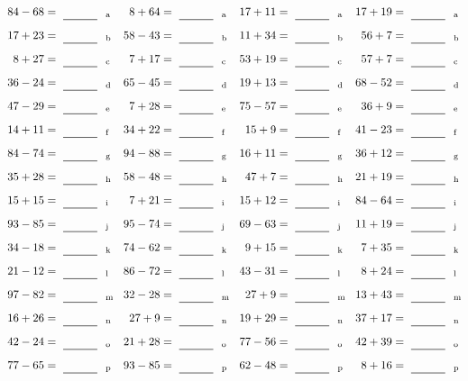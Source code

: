 \documentclass
[
  draft    = true,
  fontsize = 11pt,
  parskip  = half-
]
{scrartcl}
\begin{document}
\clearpage
\begin{align*}
    \pline{84-68}&=\rline{a}
  & \pline{8+64}&=\rline{a}
  & \pline{17+11}&=\rline{a}
  & \pline{17+19}&=\rline{a} \\[1ex]
    \pline{17+23}&=\rline{b}
  & \pline{58-43}&=\rline{b}
  & \pline{11+34}&=\rline{b}
  & \pline{56+7}&=\rline{b} \\[1ex]
    \pline{8+27}&=\rline{c}
  & \pline{7+17}&=\rline{c}
  & \pline{53+19}&=\rline{c}
  & \pline{57+7}&=\rline{c} \\[1ex]
    \pline{36-24}&=\rline{d}
  & \pline{65-45}&=\rline{d}
  & \pline{19+13}&=\rline{d}
  & \pline{68-52}&=\rline{d} \\[1ex]
    \pline{47-29}&=\rline{e}
  & \pline{7+28}&=\rline{e}
  & \pline{75-57}&=\rline{e}
  & \pline{36+9}&=\rline{e} \\[1ex]
    \pline{14+11}&=\rline{f}
  & \pline{34+22}&=\rline{f}
  & \pline{15+9}&=\rline{f}
  & \pline{41-23}&=\rline{f} \\[1ex]
    \pline{84-74}&=\rline{g}
  & \pline{94-88}&=\rline{g}
  & \pline{16+11}&=\rline{g}
  & \pline{36+12}&=\rline{g} \\[1ex]
    \pline{35+28}&=\rline{h}
  & \pline{58-48}&=\rline{h}
  & \pline{47+7}&=\rline{h}
  & \pline{21+19}&=\rline{h} \\[1ex]
    \pline{15+15}&=\rline{i}
  & \pline{7+21}&=\rline{i}
  & \pline{15+12}&=\rline{i}
  & \pline{84-64}&=\rline{i} \\[1ex]
    \pline{93-85}&=\rline{j}
  & \pline{95-74}&=\rline{j}
  & \pline{69-63}&=\rline{j}
  & \pline{11+19}&=\rline{j} \\[1ex]
    \pline{34-18}&=\rline{k}
  & \pline{74-62}&=\rline{k}
  & \pline{9+15}&=\rline{k}
  & \pline{7+35}&=\rline{k} \\[1ex]
    \pline{21-12}&=\rline{l}
  & \pline{86-72}&=\rline{l}
  & \pline{43-31}&=\rline{l}
  & \pline{8+24}&=\rline{l} \\[1ex]
    \pline{97-82}&=\rline{m}
  & \pline{32-28}&=\rline{m}
  & \pline{27+9}&=\rline{m}
  & \pline{13+43}&=\rline{m} \\[1ex]
    \pline{16+26}&=\rline{n}
  & \pline{27+9}&=\rline{n}
  & \pline{19+29}&=\rline{n}
  & \pline{37+17}&=\rline{n} \\[1ex]
    \pline{42-24}&=\rline{o}
  & \pline{21+28}&=\rline{o}
  & \pline{77-56}&=\rline{o}
  & \pline{42+39}&=\rline{o} \\[1ex]
    \pline{77-65}&=\rline{p}
  & \pline{93-85}&=\rline{p}
  & \pline{62-48}&=\rline{p}
  & \pline{8+16}&=\rline{p}
\end{align*}
\end{document}
